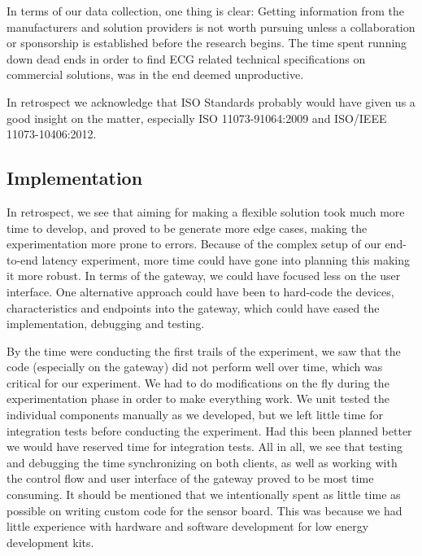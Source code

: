 In terms of our data collection, one thing is clear: Getting information from the manufacturers and solution providers is not worth pursuing unless a collaboration or sponsorship is established before the research begins. The time spent running down dead ends in order to find ECG related technical specifications on commercial solutions, was in the end deemed unproductive.

In retrospect we acknowledge that ISO Standards probably would have given us a good insight on the matter, especially ISO 11073-91064:2009 and ISO/IEEE 11073-10406:2012.



\subsection{Implementation} %
\label{sub:implementation}


In retrospect, we see that aiming for making a flexible solution took much more time to develop, and proved to be generate more edge cases, making the experimentation more prone to errors. Because of the complex setup of our end-to-end latency experiment, more time could have gone into planning this making it more robust. In terms of the gateway, we could have focused less on the user interface. One alternative approach could have been to hard-code the devices, characteristics and endpoints into the gateway, which could have eased the implementation, debugging and testing. 

By the time were conducting the first trails of the experiment, we saw that the code (especially on the gateway) did not perform well over time, which was critical for our experiment. We had to do modifications on the fly during the experimentation phase in order to make everything work. We unit tested the individual components manually as we developed, but we left little time for integration tests before conducting the experiment. Had this been planned better we would have reserved time for integration tests. All in all, we see that testing and debugging the time synchronizing on both clients, as well as working with the control flow and user interface of the gateway proved to be most time consuming. It should be mentioned that we intentionally spent as little time as possible on writing custom code for the sensor board. This was because we had little experience with hardware and software development for low energy development kits. 

